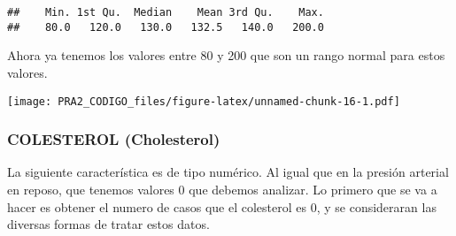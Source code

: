 \documentclass[
]{article}
\newenvironment{Shaded}{\begin{snugshade}}{\end{snugshade}}
\newcommand{\AttributeTok}[1]{\textcolor[rgb]{0.80,0.80,0.80}{#1}}
\newcommand{\CommentTok}[1]{\textcolor[rgb]{0.50,0.62,0.50}{#1}}
\newcommand{\DecValTok}[1]{\textcolor[rgb]{0.86,0.86,0.80}{#1}}
\newcommand{\FloatTok}[1]{\textcolor[rgb]{0.75,0.75,0.82}{#1}}
\newcommand{\FunctionTok}[1]{\textcolor[rgb]{0.94,0.94,0.56}{#1}}
\newcommand{\NormalTok}[1]{\textcolor[rgb]{0.80,0.80,0.80}{#1}}
\newcommand{\OtherTok}[1]{\textcolor[rgb]{0.94,0.94,0.56}{#1}}
\newcommand{\SpecialCharTok}[1]{\textcolor[rgb]{0.86,0.64,0.64}{#1}}
\newcommand{\StringTok}[1]{\textcolor[rgb]{0.80,0.58,0.58}{#1}}
\begin{document}
\begin{verbatim}
##    Min. 1st Qu.  Median    Mean 3rd Qu.    Max. 
##    80.0   120.0   130.0   132.5   140.0   200.0
\end{verbatim}

Ahora ya tenemos los valores entre 80 y 200 que son un rango normal para
estos valores.

\begin{Shaded}
\end{Shaded}

\texttt{[image: PRA2\_CODIGO\_files/figure-latex/unnamed-chunk-16-1.pdf]}

\hypertarget{colesterol-cholesterol}{%
\subsubsection{COLESTEROL (Cholesterol)}\label{colesterol-cholesterol}}

La siguiente característica es de tipo numérico. Al igual que en la
presión arterial en reposo, que tenemos valores 0 que debemos analizar.
Lo primero que se va a hacer es obtener el numero de casos que el
colesterol es 0, y se consideraran las diversas formas de tratar estos
datos.

\begin{Shaded}
\end{Shaded}
\end{document}
